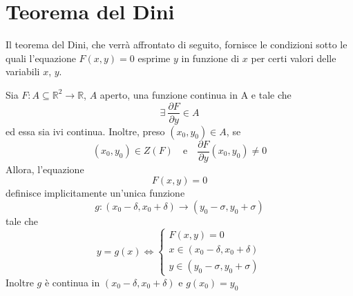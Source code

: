 \section{Teorema del Dini}
Il teorema del Dini, che verrà affrontato di seguito, fornisce le condizioni sotto le quali l'equazione $F(x,y)=0$ esprime $y$ in funzione di $x$ per certi valori delle variabili $x$, $y$.
\newpage
\begin{theorem} \label{Teo: Teorema del Dini}
    Sia $F: A \subseteq \mathbb{R}^2 \to \mathbb{R}$, $A$ aperto, una funzione continua in A e tale che
    \begin{equation}
    \exists\ \frac{\partial{F}}{\partial{y}} \in A 
    \end{equation}
    ed essa sia ivi continua. Inoltre, preso $(x_0, y_0) \in A$, se 
    \begin{equation}
    (x_0, y_0) \in Z(F) \quad \text{e} \quad \frac{\partial{F}}{\partial{y}}(x_0, y_0) \neq 0
    \end{equation}
    Allora, l'equazione
    \begin{equation}
        F(x, y)=0
    \end{equation}
    definisce implicitamente un'unica funzione
    \begin{equation}
        g: (x_0-\delta, x_0+\delta) \to (y_0 - \sigma, y_0+\sigma)
    \end{equation}
    tale che 
    \begin{equation} \label{Eq: Tesi Dini}
     y=g(x) \iff
        \begin{cases}
            F(x, y)=0\\
            x \in (x_0-\delta, x_0+\delta)\\
            y \in (y_0 - \sigma, y_0+\sigma)
        \end{cases} 
    \end{equation}
    Inoltre $g$ è continua in $(x_0-\delta, x_0+\delta)$ e $g(x_0)=y_0$
\end{theorem}
